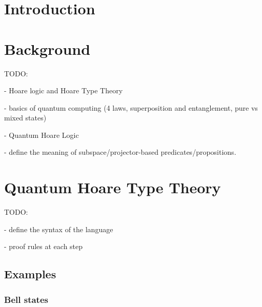 \documentclass[adraft,creativecommons]{eptcs}
\title{\titlerunning}
\author{
\authorrunning
\institute{University of Chicago}
\email{\mailtodomain{ks@cs.uchicago.edu}}
}
\begin{document}
\maketitle

\begin{abstract}
    \blindtext
\end{abstract}

\thispagestyle{empty}

\tableofcontents

\listoffigures

\lstlistoflistings


\clearpage


\section{Introduction}

\blindtext

\section{Background}

TODO:

- Hoare logic and Hoare Type Theory

- basics of quantum computing (4 laws, superposition and entanglement, pure vs mixed states)

- Quantum Hoare Logic

- define the meaning of subspace/projector-based predicates/propositions.

\section{Quantum Hoare Type Theory}

TODO:

- define the syntax of the language

- proof rules at each step

\subsection{Examples}

\blindtext

\subsubsection{Bell states}
\end{document}
